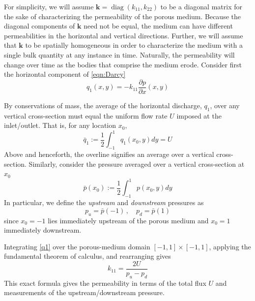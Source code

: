 \documentclass[3p]{elsarticle}
\newcommand{\pderiv}[2]{\frac{\partial #1}{\partial #2}}
\newcommand{\bvec}[1]{\mathbf{#1}}
\newcommand{\qavg}{\bar{q}}
\newcommand{\pavg}{\bar{p}}
\newcommand{\pup}{p_u}
\newcommand{\pdn}{p_d}
\newcommand{\diag}{\mathop{\mathrm{diag}}}
\begin{document}


For simplicity, we will assume $\bvec{k}  = \diag(k_{11}, k_{22})$ to be a diagonal matrix for the sake of characterizing the permeability of the porous medium. Because the diagonal components of $\bvec{k}$ need not be equal, the medium can have different permeabilities in the horizontal and vertical directions. Further, we will assume that $\bvec{k}$ to be spatially homogeneous in order to characterize the medium with a single bulk quantity at any instance in time. Naturally, the permeability will change over time as the bodies that comprise the medium erode. Consider first the horizontal component of \eqref{eqn:Darcy}
\begin{equation}
\label{q1}
q_1(x,y) = -k_{11} \pderiv{p}{x}(x,y)
\end{equation}

By conservations of mass, the average of the horizontal discharge, $q_1$, over any vertical cross-section must equal the uniform flow rate $U$ imposed at the inlet/outlet. That is, for any location $x_0$,
\begin{equation}
\qavg_1 := \frac{1}{2} \int_{-1}^{1} q_1(x_0, y) dy = U
\end{equation}
Above and henceforth, the overline signifies an average over a vertical cross-section. Similarly, consider the pressure averaged over a vertical cross-section at $x_0$
\begin{equation}
\pavg(x_0) := \frac{1}{2} \int_{-1}^{1} p(x_0, y) dy
\end{equation}
In particular, we define the {\em upstream} and {\em downstream} pressures as
\begin{equation}
\pup = \pavg(-1) \, , \quad \pdn = \pavg(1)
\end{equation}
since $x_0 = -1$ lies immediately upstream of the porous medium and $x_0 = 1$ immediately downstream.

Integrating \eqref{q1} over the porous-medium domain $[-1, 1] \times [-1,1]$, applying the fundamental theorem of calculus, and rearranging gives
\begin{equation}
\label{eqn:k11}
k_{11} = \frac{2U}{\pup - \pdn}
\end{equation}
This exact formula gives the permeability in terms of the total flux $U$ and measurements of the upstream/downstream pressure.
\end{document}
